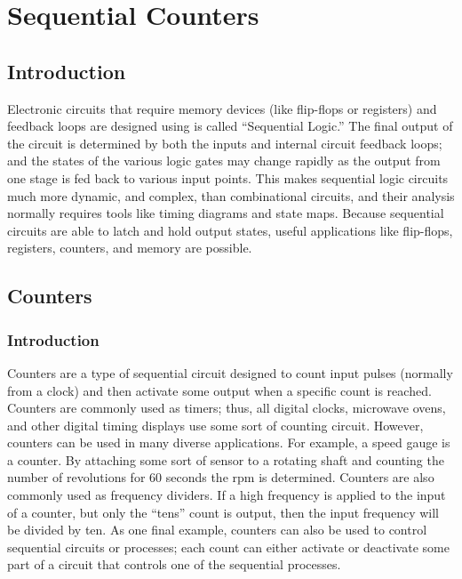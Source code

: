 \chapter{Sequential Counters}\label{ch11}
\section{Introduction}

Electronic circuits that require memory devices (like flip-flops or registers) and feedback loops are designed using is called ``Sequential Logic.'' The final output of the circuit is determined by both the inputs and internal circuit feedback loops; and the states of the various logic gates may change rapidly as the output from one stage is fed back to various input points. This makes sequential logic circuits much more dynamic, and complex, than combinational circuits, and their analysis normally requires tools like timing diagrams and state maps. Because sequential circuits are able to latch and hold output states, useful applications like flip-flops, registers, counters, and memory are possible.

\section{Counters}
\label{SL:sec:counters}

\subsection{Introduction}
\label{SL:subsec:intro_to_counters}

Counters are a type of sequential circuit designed to count input pulses (normally from a clock) and then activate some output when a specific count is reached. Counters are commonly used as timers; thus, all digital clocks, microwave ovens, and other digital timing displays use some sort of counting circuit. However, counters can be used in many diverse applications. For example, a speed gauge is a counter. By attaching some sort of sensor to a rotating shaft and counting the number of revolutions for $ 60 $ seconds the \gls{rpm} is determined. Counters are also commonly used as frequency dividers. If a high frequency is applied to the input of a counter, but only the ``tens'' count is output, then the input frequency will be divided by ten. As one final example, counters can also be used to control sequential circuits or processes; each count can either activate or deactivate some part of a circuit that controls one of the sequential processes. 

